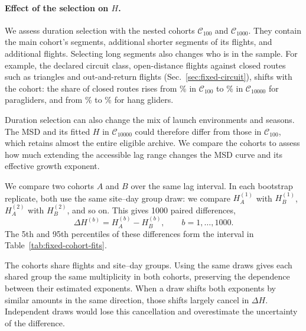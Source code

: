 \paragraph{Effect of the selection on $H$.}
We assess duration selection with the nested cohorts $\mathcal C_{100}$ and
$\mathcal C_{1000}$. They contain the main cohort's segments, additional shorter
segments of its flights, and additional flights. Selecting long segments also changes
who is in the sample. For example, the declared circuit class, open-distance flights
against closed routes such as triangles and out-and-return flights
(Sec.~\ref{sec:fixed-circuit}), shifts with the cohort: the share of closed routes
rises from
\ChThreeParaClosedFracStart\% in $\mathcal C_{100}$ to \ChThreeParaClosedFracMain\% in
$\mathcal C_{10000}$ for paragliders, and from \ChThreeHangClosedFracStart\% to
\ChThreeHangClosedFracMain\% for hang gliders.

Duration selection can also change the mix of launch environments and seasons.
The MSD and its fitted $H$ in $\mathcal C_{10000}$ could therefore differ from those
in $\mathcal C_{100}$, which retains almost the entire eligible archive. We compare
the cohorts to assess how much extending the accessible lag range changes the MSD
curve and its effective growth exponent.

We compare two cohorts $A$ and $B$ over the same lag interval. In each bootstrap
replicate, both use the same site--day group draw: we compare $H_A^{(1)}$ with
$H_B^{(1)}$, $H_A^{(2)}$ with $H_B^{(2)}$, and so on. This gives 1000 paired
differences,
\[
 \Delta H^{(b)}=H_A^{(b)}-H_B^{(b)},\qquad b=1,\ldots,1000.
\]
The 5th and 95th percentiles of these differences form the interval in
Table~\ref{tab:fixed-cohort-fits}.

The cohorts share flights and site--day groups. Using the same draws gives each
shared group the same multiplicity in both cohorts, preserving the dependence
between their estimated exponents. When a draw shifts both exponents by similar
amounts in the same direction, those shifts largely cancel in $\Delta H$. Independent
draws would lose this cancellation and overestimate the uncertainty of the
difference.


